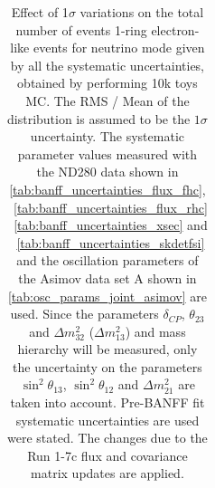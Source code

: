 \begin{table}[htb]
\begin{tabular}{| c | c | c |}
\end{tabular}
\caption{
 Effect of 1$\sigma$ variations on the total number of events 1-ring electron-like events for neutrino mode
 given by all the systematic uncertainties, obtained by performing 10k toys MC.
The RMS / Mean of the distribution is assumed to be the $1\sigma$ uncertainty.
The systematic parameter values measured with the ND280 data 
shown in 
\cref{tab:banff_uncertainties_flux_fhc},
~\ref{tab:banff_uncertainties_flux_rhc}
~\ref{tab:banff_uncertainties_xsec}
and
~\ref{tab:banff_uncertainties_skdetfsi}
and the oscillation parameters of the Asimov data set A shown in \cref{tab:osc_params_joint_asimov}
are used.
Since the parameters $\delta_{CP}$, $\theta_{23}$ and $\Delta m^2_{32}$ ($\Delta m^2_{13}$) and mass hierarchy
will be measured,
only the uncertainty on the parameters 
$\sin^2 \theta_{13}$,
$\sin^2 \theta_{12}$
and 
$\Delta m^2_{21}$ 
are taken into account.
Pre-BANFF fit systematic uncertainties are used were stated.
The changes due to the Run 1-7c flux and covariance matrix updates are applied.
}                                                                                                                                                                                          
\label{tab:nsk_systematic_table_summary_joint_asimov_A_fhc_elike_Run17c}
\end{table}





